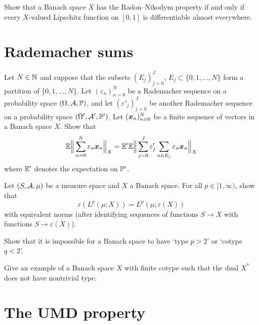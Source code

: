 \documentclass[a4paper,10pt]{amsbook}
\begin{document}
\begin{exercise}
  Show that a Banach space $X$ has the Radon--Nikodym property if and only if every $X$-valued Lipschitz function on $[0,1]$ is differentiable almost everywhere.
\end{exercise}

\section{Rademacher sums}

\begin{exercise}
  Let $N \in \N$ and suppose that the subsets $(E_{j})_{j=0}^{J}$, $E_{j} \subset \{0,1,\ldots,N\}$ form a partition of $\{0,1,\ldots,N\}$.
  Let $(\varepsilon_{n})_{n=0}^{N}$ be a Rademacher sequence on a probability space $(\Omega,\mc{A},\P)$, and let $(\varepsilon'_{j})_{j=0}^{J}$ be another Rademacher sequence on a probability space $(\Omega', \mc{A}', \P')$.
  Let $(\mb{x}_{n})_{n=0}^{N}$ be a finite sequence of vectors in a Banach space $X$.
  Show that
  \begin{equation*}
    \E \Big\| \sum_{n=0}^{N} \varepsilon_{n} \mb{x}_{n} \Big\|_{X} = \E' \E \Big\| \sum_{j=0}^{J} \varepsilon'_{j} \sum_{n \in E_{j}} \varepsilon_{n} \mb{x}_{n} \Big\|_{X}
  \end{equation*}
  where $\E'$ denotes the expectation on $\P'$.
\end{exercise}

\begin{exercise}
  Let $(S,\mc{A},\mu)$ be a measure space and $X$ a Banach space.
  For all $p \in [1,\infty)$, show that
  \begin{equation*}
    \varepsilon(L^{p}(\mu;X)) = L^{p}(\mu;\varepsilon(X))
  \end{equation*}
  with equivalent norms (after identifying sequences of functions $S \to X$ with functions $S \to \varepsilon(X)$). 
\end{exercise}

\begin{exercise}
  Show that it is impossible for a Banach space to have `type $p > 2$' or `cotype $q < 2$'.
\end{exercise}

\begin{exercise}
  Give an example of a Banach space $X$ with finite cotype such that the dual $X^{*}$ does not have nontrivial type.
\end{exercise}

\section{The UMD property}
\end{document}
